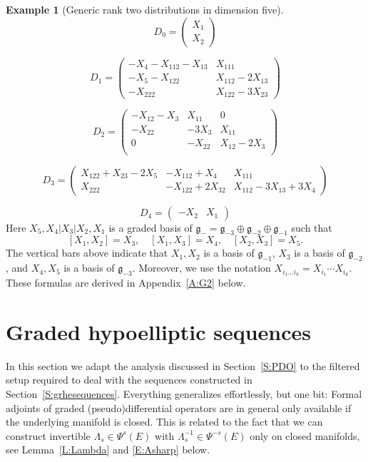 \documentclass[reqno,12pt]{amsart}
\newcommand\goe{\mathfrak g}
\theoremstyle{plain}
\theoremstyle{definition}
\newtheorem{example}[theorem]{Example}
\begin{document}
\begin{example}[Generic rank two distributions in dimension five]
$$
D_0=\left(\begin{array}{c}
X_1\\
X_2
\end{array}\right)
$$

$$
D_1=\left(\begin{array}{cc}
-X_4-X_{112}-X_{13}&X_{111}\\
-X_5-X_{122}&X_{112}-2X_{13}\\
-X_{222}&X_{122}-3X_{23}
\end{array}\right)
$$

$$
D_2=\left(\begin{array}{ccc}
-X_{12}-X_3&X_{11}& 0\\         
-X_{22}&-3X_3&  X_{11}\\ 
0&        -X_{22}&X_{12}-2X_3\\
\end{array}\right)
$$

$$
D_3=\left(\begin{array}{ccc}
X_{122}+X_{23}-2X_5&-X_{112}+X_4&X_{111}\\
X_{222}&-X_{122}+2X_{32}&X_{112}-3X_{13}+3X_4
\end{array}\right)
$$

$$
D_4=\left(\begin{array}{cc}
-X_2&X_1
\end{array}\right)
$$
Here $X_5,X_4|X_3|X_2,X_1$ is a graded basis of $\goe_-=\goe_{-3}\oplus\goe_{-2}\oplus\goe_{-1}$ such that
$$
[X_1,X_2]=X_3,\quad[X_1,X_3]=X_4,\quad[X_2,X_3]=X_5.
$$
The vertical bars above indicate that $X_1,X_2$ is a basis of $\goe_{-1}$, $X_3$ is a basis of $\goe_{-2}$, and $X_4,X_5$ is a basis of $\goe_{-3}$.
Moreover, we use the notation $X_{i_1\dotsc i_k}=X_{i_1}\cdots X_{i_k}$.
These formulas are derived in Appendix~\ref{A:G2} below.
\end{example}












\section{Graded hypoelliptic sequences}\label{S:grRockland}










In this section we adapt the analysis discussed in Section~\ref{S:PDO} to the filtered setup required to deal with the sequences constructed in Section~\ref{S:grhesequences}.
Everything generalizes effortlessly, but one bit: Formal adjoints of graded (pseudo)differential operators are in general only available if the underlying manifold is closed.
This is related to the fact that we can construct invertible $\Lambda_s\in\Psi^s(E)$ with $\Lambda_s^{-1}\in\Psi^{-s}(E)$ only on closed manifolds, see Lemma~\ref{L:Lambda} and \eqref{E:Asharp} below.
\end{document}
